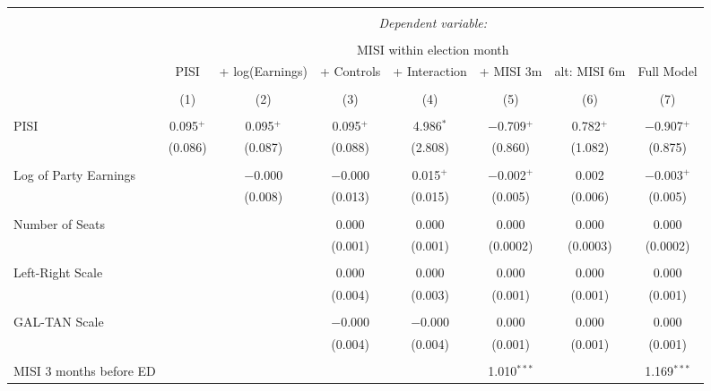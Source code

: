 
\begin{table}[!htbp] \centering 
  \caption{} 
  \label{} 
\large 
\begin{tabular}{@{\extracolsep{50pt}}lccccccc} 
\\[-1.8ex]\hline 
\hline \\[-1.8ex] 
 & \multicolumn{7}{c}{\textit{Dependent variable:}} \\ 
\cline{2-8} 
\\[-1.8ex] & \multicolumn{7}{c}{MISI within election month} \\ 
 & PISI & + log(Earnings) & + Controls & + Interaction & + MISI 3m & alt: MISI 6m & Full Model \\ 
\\[-1.8ex] & (1) & (2) & (3) & (4) & (5) & (6) & (7)\\ 
\hline \\[-1.8ex] 
 PISI & 0.095$^{+}$ & 0.095$^{+}$ & 0.095$^{+}$ & 4.986$^{*}$ & $-$0.709$^{+}$ & 0.782$^{+}$ & $-$0.907$^{+}$ \\ 
  & (0.086) & (0.087) & (0.088) & (2.808) & (0.860) & (1.082) & (0.875) \\ 
  & & & & & & & \\ 
 Log of Party Earnings &  & $-$0.000 & $-$0.000 & 0.015$^{+}$ & $-$0.002$^{+}$ & 0.002 & $-$0.003$^{+}$ \\ 
  &  & (0.008) & (0.013) & (0.015) & (0.005) & (0.006) & (0.005) \\ 
  & & & & & & & \\ 
 Number of Seats &  &  & 0.000 & 0.000 & 0.000 & 0.000 & 0.000 \\ 
  &  &  & (0.001) & (0.001) & (0.0002) & (0.0003) & (0.0002) \\ 
  & & & & & & & \\ 
 Left-Right Scale &  &  & 0.000 & 0.000 & 0.000 & 0.000 & 0.000 \\ 
  &  &  & (0.004) & (0.003) & (0.001) & (0.001) & (0.001) \\ 
  & & & & & & & \\ 
 GAL-TAN Scale &  &  & $-$0.000 & $-$0.000 & 0.000 & 0.000 & 0.000 \\ 
  &  &  & (0.004) & (0.004) & (0.001) & (0.001) & (0.001) \\ 
  & & & & & & & \\ 
 MISI 3 months before ED &  &  &  &  & 1.010$^{***}$ &  & 1.169$^{***}$ \\ 

\end{tabular}
\end{table}
